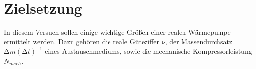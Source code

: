 \section{Zielsetzung}
\label{sec:Zielsetzung}
In diesem Versuch sollen einige wichtige Größen einer realen Wärmepumpe ermittelt werden.
Dazu gehören die reale Güteziffer $\nu$, der Massendurchsatz $\increment m (\increment t)^{-1}$ eines Austauschmediums,
sowie die mechanische Kompressorleistung $N_{mech}$. 